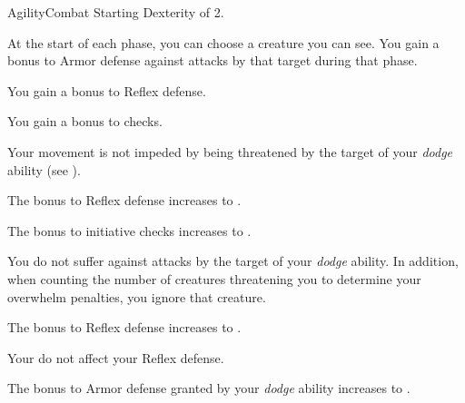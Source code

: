     \begin{feat}{Agility}{Combat}
        \featpre Starting Dexterity of 2.
        \featben

         At the start of each phase, you can choose a creature you can see.
        You gain a  bonus to Armor defense against attacks by that target during that phase.

         You gain a  bonus to Reflex defense.

         You gain a  bonus to  checks.

         Your movement is not impeded by being threatened by the target of your \textit{dodge} ability (see ).

         The bonus to Reflex defense increases to .

         The bonus to initiative checks increases to .

         You do not suffer  against attacks by the target of your \textit{dodge} ability.
        In addition, when counting the number of creatures threatening you to determine your overwhelm penalties, you ignore that creature.

         The bonus to Reflex defense increases to .

         Your  do not affect your Reflex defense.

         The bonus to Armor defense granted by your \textit{dodge} ability increases to .
    \end{feat}

